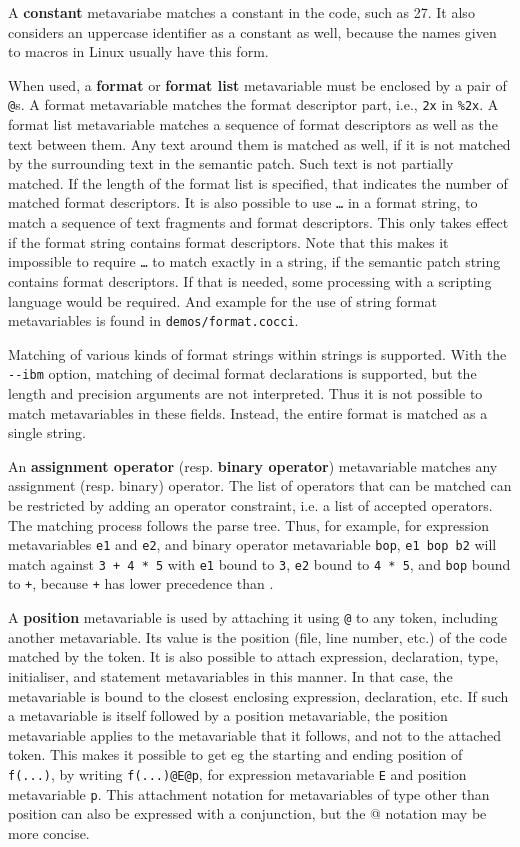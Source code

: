 A {\bf constant} metavariabe matches a constant in the code, such as 27. It also
considers an uppercase identifier as a constant as well, because the names given
to macros in Linux usually have this form.

When used, a {\bf format} or {\bf format list} metavariable must be
enclosed by a pair of \texttt{@}s.  A format metavariable matches the
format descriptor part, i.e., \texttt{2x} in \texttt{\%2x}.  A format list
metavariable matches a sequence of format descriptors as well as the text
between them.  Any text around them is matched as well, if it is not
matched by the surrounding text in the semantic patch.  Such text is not
partially matched.  If the length of the format list is specified, that
indicates the number of matched format descriptors.  It is also possible to
use \texttt{\ldots} in a format string, to match a sequence of text
fragments and format descriptors.  This only takes effect if the format
string contains format descriptors.  Note that this makes it impossible to
require \texttt{\ldots} to match exactly in a string, if the semantic patch
string contains format descriptors.  If that is needed, some processing
with a scripting language would be required.  And example for the use of
string format metavariables is found in {\tt demos/format.cocci}.

Matching of various kinds of format strings within strings is supported.
With the {\tt -{}-ibm} option, matching of decimal format declarations is
supported, but the length and precision arguments are not interpreted.
Thus it is not possible to match metavariables in these fields.  Instead,
the entire format is matched as a single string.

An {\bf assignment operator} (resp. {\bf binary operator}) metavariable matches
any assignment (resp. binary) operator. The list of operators that can be
matched can be restricted by adding an operator constraint, i.e. a list of
accepted operators.  The matching process follows the parse tree.  Thus,
for example, for expression metavariables {\tt e1} and {\tt e2}, and binary
operator metavariable {\tt bop}, {\tt e1 bop b2} will match against {\tt 3
  + 4 * 5} with {\tt e1} bound to {\tt 3}, {\tt e2} bound to {\tt 4 * 5},
and {\tt bop} bound to {\tt +}, because {\tt +} has lower precedence than
{\tt *}.

A {\bf position} metavariable is used by attaching it using \texttt{@} to
any token, including another metavariable. Its value is the position
(file, line number, etc.) of the code matched by the token. It is also
possible to attach expression, declaration, type, initialiser, and
statement metavariables in this manner. In that case, the metavariable is
bound to the closest enclosing expression, declaration, etc. If such a
metavariable is itself followed by a position metavariable, the position
metavariable applies to the metavariable that it follows, and not to the
attached token. This makes it possible to get eg the starting and ending
position of {\tt f(...)}, by writing {\tt f(...)@E@p}, for expression
metavariable {\tt E} and position metavariable {\tt p}. This attachment
notation for metavariables of type other than position can also be
expressed with a conjunction, but the @ notation may be more concise.

